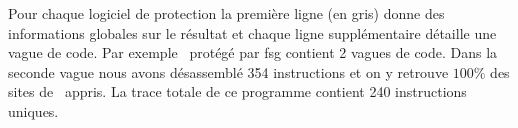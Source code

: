 Pour chaque logiciel de protection la première ligne (en gris) donne des informations globales sur le résultat et chaque ligne supplémentaire détaille une vague de code.
Par exemple \hostname\ protégé par fsg contient 2 vagues de code. Dans la seconde vague nous avons désassemblé 354 instructions et on y retrouve $100\%$ des sites de \hostname\ appris. La trace totale de ce programme contient 240 instructions uniques.

\begin{landscape}
\begin{small}

\end{small}
\end{landscape}
